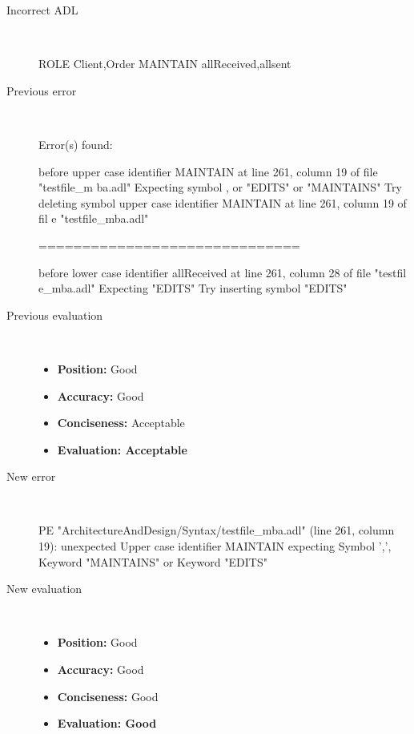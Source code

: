 \hrulefill

\begin{description}
  \item[Incorrect ADL]~\\
\begin{adl}
ROLE Client,Order MAINTAIN allReceived,allsent\end{adl}
  \item[Previous error]~\\
\begin{haskell}
Error(s) found:

before upper case identifier MAINTAIN at line 261, column 19 of file "testfile_m
ba.adl"
Expecting symbol , or "EDITS" or "MAINTAINS"
Try deleting symbol upper case identifier MAINTAIN at line 261, column 19 of fil
e "testfile_mba.adl"

==============================

before lower case identifier allReceived at line 261, column 28 of file "testfil
e_mba.adl"
Expecting "EDITS"
Try inserting symbol "EDITS"\end{haskell}
  \item[Previous evaluation]~\\
    \begin{itemize}
    \item \textbf{Position:} Good
    \item \textbf{Accuracy:} Good
    \item \textbf{Conciseness:} Acceptable
    \item \textbf{Evaluation: Acceptable}
    \end{itemize}
  \item[New error]~\\
\begin{haskell}
PE "ArchitectureAndDesign/Syntax/testfile_mba.adl" (line 261, column 19):
unexpected Upper case identifier MAINTAIN
expecting Symbol ',', Keyword "MAINTAINS" or Keyword "EDITS"\end{haskell}
  \item[New evaluation]~\\
    \begin{itemize}
    \item \textbf{Position:} Good
    \item \textbf{Accuracy:} Good
    \item \textbf{Conciseness:} Good
    \item \textbf{Evaluation: Good}
    \end{itemize}
  \end{description}